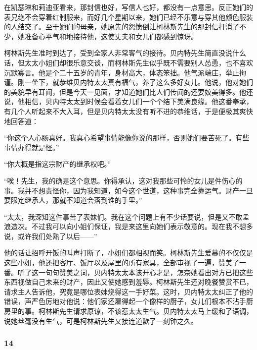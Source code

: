 \par 在凯瑟琳和莉迪亚看来，那封信也好，写信人也好，都没有一点意思。反正她们的表兄绝不会穿着红制服来，而好几个星期以来，她们已经不乐意与穿其他颜色服装的人结交了。至于她们的母亲，她原先的怨愤倒让柯林斯先生的那封信打消了不少，她准备心平气和地接待他，这使丈夫和女儿们都感到惊讶。
\par 柯林斯先生准时到达了，受到全家人非常客气的接待。贝内特先生简直没说什么话，但太太小姐们却很乐意交谈，而柯林斯先生似乎既不需要别人怂恿，也不喜欢沉默寡言。他是个二十五岁的青年，身材高大，体态笨拙。他气派端庄，举止拘谨。刚一坐下，就恭维贝内特太太真有福气，养了这么多好女儿。他说，他对她们的美貌早有耳闻，但是今天一见面，才知道她们比人们传闻的还要姣美得多。他还说，他相信，贝内特太太到时候会看着女儿们一个个结下美满良缘。他这番奉承，有几个人听起来不大入耳，但是贝内特太太没有听不进的恭维话，于是便极其爽快地回答道：
\par “你这个人心肠真好。我真心希望事情能像你说的那样，否则她们要苦死了。有些事情办得就是怪。”
\par “你大概是指这宗财产的继承权吧。”
\par “唉！先生，我的确是这个意思。你得承认，这对我那些可怜的女儿是件伤心的事。我并不想责怪你，因为我知道，如今这个世道，这种事完全靠运气。财产一旦要限定继承人，那就不知道会落到谁的手里。”
\par “太太，我深知这件事苦了表妹们。我在这个问题上有不少话要说，但是又不敢孟浪造次。不过我可以向小姐们保证，我是来这里向她们表示敬意的。现在我不想多说，或许我们处熟了以后——”
\par 他的话让招呼开饭的叫声打断了，小姐们都相视而笑。柯林斯先生爱慕的不仅仅是这些小姐，他还把客厅、饭厅以及屋里的所有家具，全部审视了一遍，赞美了一番。听了这一句句赞美之词，贝内特太太本该开心才是，怎奈她看出对方已把这些东西视做自己未来的财产，因此又使她感到羞辱。柯林斯先生还对晚餐赞赏不已，请求主人告诉他，究竟是哪位表妹烧得这一手好菜。这时，贝内特太太纠正了他的错误，声严色厉地对他说：他们家还雇得起一个像样的厨子，女儿们根本不沾手厨房里的事。柯林斯先生请求原谅，不该惹太太生气。贝内特太太马上缓和了语调，说她丝毫没有生气，可是柯林斯先生又接连道歉了一刻钟之久。



\subsubsection*{14}


